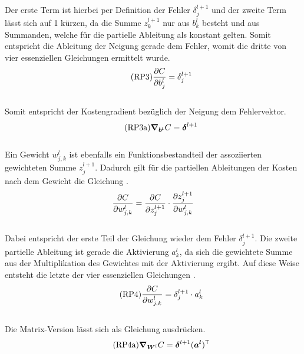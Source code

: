 \begin{appendices}
\begin{equation}
\end{equation}
\\
Der erste Term ist hierbei per Definition der Fehler $\delta_j^{l+1}$ und der
zweite Term lässt sich auf 1 kürzen, da die Summe $z_k^{l+1}$ nur aus
$b_k^l$ besteht und aus Summanden, welche für die partielle Ableitung als konstant gelten.
Somit entspricht die Ableitung der Neigung gerade dem Fehler, womit die
dritte  von vier essenziellen Gleichungen ermittelt wurde.
\\
\begin{equation}\tag{RP3}\label{eq:RP3}
  \frac{\partial C}{\partial b_j^l} = \delta_j^{l+1}
\end{equation}
\\
Somit entspricht der Kostengradient bezüglich der Neigung dem Fehlervektor.
\\
\begin{equation}\tag{RP3a}\label{eq:RP3a}
  \bm{\nabla}_{\bm{b^l}} C =  \bm{\delta}^{l+1}
\end{equation}
\\
Ein Gewicht $w_{j,k}^l$ ist ebenfalls ein Funktionsbestandteil der assoziierten
gewichteten Summe $z_j^{l+1}$. Dadurch gilt für die partiellen Ableitungen der
Kosten nach dem Gewicht die Gleichung .
\\
\begin{equation}\label{eq:RPh4}
  \frac{\partial C}{\partial w_{j,k}^l} = \frac{\partial C}{\partial z_j^{l+1}} \cdot \frac{\partial z_j^{l+1}}{\partial w_{j,k}^l}
\end{equation}
\\
Dabei entspricht der erste Teil der Gleichung wieder dem Fehler $\delta_j^{l+1}$.
Die zweite partielle Ableitung ist gerade die Aktivierung $a_k^l$, da sich die
gewichtete Summe aus der Multiplikation des Gewichtes mit der Aktivierung ergibt.
Auf diese Weise entsteht die letzte der vier essenziellen Gleichungen .
\begin{equation}\tag{RP4}\label{eq:RP4}
  \frac{\partial C}{\partial w_{j,k}^l} = \delta_j^{l+1} \cdot a_k^l
\end{equation}
\\
Die Matrix-Version lässt sich als Gleichung  ausdrücken.
\begin{equation}\tag{RP4a}\label{eq:RP4a}
  \bm{\nabla}_{\bm{W}^l} C = \bm{\delta}^{l+1} (\bm{a^l})^{\mathsf{T}}
\end{equation}


\end{appendices}
